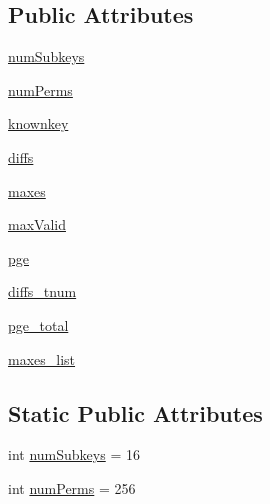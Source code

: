 \subsection*{Public Attributes}
\begin{DoxyCompactItemize}
\item 
\hyperlink{classsoftware_1_1chipwhisperer_1_1analyzer_1_1attacks_1_1__stats_1_1DataTypeDiffs_a29918d303cff0eb584eb304338ff6291}{num\+Subkeys}
\item 
\hyperlink{classsoftware_1_1chipwhisperer_1_1analyzer_1_1attacks_1_1__stats_1_1DataTypeDiffs_ad80f8277949c5e34ee82c09eb4a9c5ec}{num\+Perms}
\item 
\hyperlink{classsoftware_1_1chipwhisperer_1_1analyzer_1_1attacks_1_1__stats_1_1DataTypeDiffs_ae06b03c5b428cbf97d5d6d6927d0d149}{knownkey}
\item 
\hyperlink{classsoftware_1_1chipwhisperer_1_1analyzer_1_1attacks_1_1__stats_1_1DataTypeDiffs_adaab5796ed161daf2bcb0ee44930f34a}{diffs}
\item 
\hyperlink{classsoftware_1_1chipwhisperer_1_1analyzer_1_1attacks_1_1__stats_1_1DataTypeDiffs_afb79f5cbbb929c23e7d9e2c19bfd60c6}{maxes}
\item 
\hyperlink{classsoftware_1_1chipwhisperer_1_1analyzer_1_1attacks_1_1__stats_1_1DataTypeDiffs_a1000939d8fa01b2d59419318ecaca9dc}{max\+Valid}
\item 
\hyperlink{classsoftware_1_1chipwhisperer_1_1analyzer_1_1attacks_1_1__stats_1_1DataTypeDiffs_a9a6e9ed484d1856b02bac8cc19d2aa96}{pge}
\item 
\hyperlink{classsoftware_1_1chipwhisperer_1_1analyzer_1_1attacks_1_1__stats_1_1DataTypeDiffs_a234110495a5f5f87a6d5a0e4e0db7860}{diffs\+\_\+tnum}
\item 
\hyperlink{classsoftware_1_1chipwhisperer_1_1analyzer_1_1attacks_1_1__stats_1_1DataTypeDiffs_a752f16f1266b80163aa5913aece61a28}{pge\+\_\+total}
\item 
\hyperlink{classsoftware_1_1chipwhisperer_1_1analyzer_1_1attacks_1_1__stats_1_1DataTypeDiffs_a4c58ed365cfb852921ecbd178a90b422}{maxes\+\_\+list}
\end{DoxyCompactItemize}
\subsection*{Static Public Attributes}
\begin{DoxyCompactItemize}
\item 
int \hyperlink{classsoftware_1_1chipwhisperer_1_1analyzer_1_1attacks_1_1__stats_1_1DataTypeDiffs_af613b36ca707a0366fb5b15d1cf9307d}{num\+Subkeys} = 16
\item 
int \hyperlink{classsoftware_1_1chipwhisperer_1_1analyzer_1_1attacks_1_1__stats_1_1DataTypeDiffs_a750ea6473c6c8c2c96ccaf006efa8e83}{num\+Perms} = 256
\end{DoxyCompactItemize}


